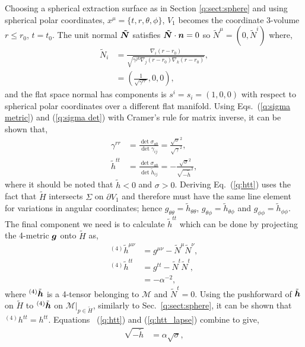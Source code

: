 Choosing a spherical extraction surface as in Section \ref{q:sect:sphere} and using spherical polar coordinates, $x^\mu = \{t,r,\theta,\phi\}$, $V_1$ becomes the coordinate 3-volume $r\leq r_0$, $t=t_0$. The unit normal $\boldsymbol{\tilde{N}}$ satisfies $\boldsymbol{\tilde{N}}\cdot \boldsymbol{n} =0$ so $\tilde N^\mu = (0,\tilde N^i)$ where, 
\begin{align}
\tilde N_i &= \frac{\nabla_i (r-r_0)}{\sqrt{\gamma^{jk}\nabla_j (r-r_0) \nabla_k (r-r_0)}}, \\ 
 &= (\frac{1}{\sqrt{\gamma^{rr}}},0,0),
\end{align}
and the flat space normal has components is $s^i = s_i = (1,0,0)$ with respect to spherical polar coordinates over a different flat manifold. Using Eqs.~(\ref{q:sigma metric}) and (\ref{q:sigma det}) with Cramer's rule for matrix inverse, it can be shown that,
\begin{align}
\gamma^{rr} &= \frac{\det \sigma_{ab}}{ \det \gamma_{ij}} = \frac{\sqrt{\sigma}^2}{\sqrt{\gamma}^2}, \\ 
\label{q:htt}\tilde{h}^{tt} &= \frac{\det \sigma_{ab}}{\det \tilde h_{ij}} = -\frac{\sqrt{\sigma}^2}{\sqrt{-\tilde h}^2},
\end{align}
where it should be noted that $\tilde h < 0$ and $\sigma > 0$. Deriving Eq.~(\ref{q:htt}) uses the fact that $\tilde H$ intersects $\Sigma$ on $\partial V_1$ and therefore must have the same line element for variations in angular coordinates; hence $g_{\theta\theta}=\tilde{h}_{\theta\theta}$, $g_{\theta\phi}=\tilde{h}_{\theta\phi}$ and $g_{\phi\phi}=\tilde{h}_{\phi\phi}$. The final component we need is to calculate $\tilde h^{tt}$ which can be done by projecting the 4-metric $\boldsymbol g$ onto $\tilde H$ as, 
\begin{align}
{}^{(4)}\tilde{h}^{\mu\nu} &= g^{\mu\nu} - \tilde{N}^\mu \tilde{N}^\nu,\\
{}^{(4)}\tilde{h}^{tt} &= g^{tt} - \tilde{N}^t\tilde{N}^t,\\
         \label{q:htt_lapse}      &= -\alpha^{-2},
\end{align}
where ${}^{(4)}\tilde{\boldsymbol{h}}$ is a 4-tensor belonging to $\mathcal{M}$ and $\tilde{N}^t=0$. Using the pushforward of $\tilde{\boldsymbol h}$ on $\tilde H$ to ${}^{(4)}\tilde{\boldsymbol h}$ on $\mathcal{M}\vert_{p\in{\tilde H}}$, similarly to Sec.~\ref{q:sect:sphere}, it can be shown that ${}^{(4)}h^{tt}=h^{tt}$. Equations ~(\ref{q:htt}) and (\ref{q:htt_lapse}) combine to give,
\begin{align}
  \sqrt{-\tilde{h}} &= \alpha \sqrt{\sigma},
\end{align}
